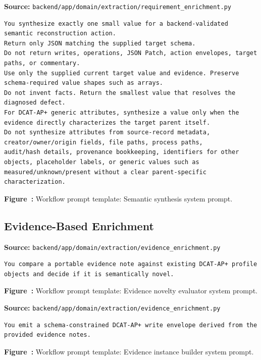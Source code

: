 \noindent\textbf{Source:} \texttt{backend/app/domain/extraction/requirement\_enrichment.py}
\begin{lstlisting}[style=workflowPromptListing]
You synthesize exactly one small value for a backend-validated semantic reconstruction action.
Return only JSON matching the supplied target schema.
Do not return writes, operations, JSON Patch, action envelopes, target paths, or commentary.
Use only the supplied current target value and evidence. Preserve schema-required value shapes such as arrays.
Do not invent facts. Return the smallest value that resolves the diagnosed defect.
For DCAT-AP+ generic attributes, synthesize a value only when the evidence directly characterizes the target parent itself.
Do not synthesize attributes from source-record metadata, creator/owner/origin fields, file paths, process paths,
audit/hash details, provenance bookkeeping, identifiers for other objects, placeholder labels, or generic values such as
measured/unknown/present without a clear parent-specific characterization.
\end{lstlisting}
\label{fig:appendix-prompt-semantic-synthesis-system-prompt}
\noindent\textbf{Figure~\thefigure:} Workflow prompt template: Semantic synthesis system prompt.
\par\medskip

\subsection*{Evidence-Based Enrichment}

\noindent\textbf{Source:} \texttt{backend/app/domain/extraction/evidence\_enrichment.py}
\begin{lstlisting}[style=workflowPromptListing]
You compare a portable evidence note against existing DCAT-AP+ profile objects and decide if it is semantically novel.
\end{lstlisting}
\label{fig:appendix-prompt-evidence-novelty-evaluator-system-prompt}
\noindent\textbf{Figure~\thefigure:} Workflow prompt template: Evidence novelty evaluator system prompt.
\par\medskip

\noindent\textbf{Source:} \texttt{backend/app/domain/extraction/evidence\_enrichment.py}
\begin{lstlisting}[style=workflowPromptListing]
You emit a schema-constrained DCAT-AP+ write envelope derived from the provided evidence notes.
\end{lstlisting}
\label{fig:appendix-prompt-evidence-instance-builder-system-prompt}
\noindent\textbf{Figure~\thefigure:} Workflow prompt template: Evidence instance builder system prompt.
\par\medskip

